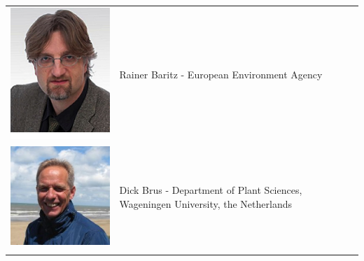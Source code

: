 \documentclass[10pt,b5paper,]{book}
\theoremstyle{definition}
\theoremstyle{definition}
\theoremstyle{definition}
\theoremstyle{remark}
\begin{document}
\begin{longtable}[]{@{}ll@{}}
\toprule
\endhead
\begin{minipage}[t]{0.11\columnwidth}\raggedright
\includegraphics{contrAuthors/Baritz.jpg}\strut
\end{minipage} & \begin{minipage}[t]{0.83\columnwidth}\raggedright
Rainer Baritz - European Environment Agency\strut
\end{minipage}\tabularnewline
\begin{minipage}[t]{0.11\columnwidth}\raggedright
\includegraphics{contrAuthors/Brus.jpg}\strut
\end{minipage} & \begin{minipage}[t]{0.83\columnwidth}\raggedright
Dick Brus - Department of Plant Sciences, Wageningen University, the
Netherlands\strut
\end{minipage}\tabularnewline
\begin{minipage}[t]{0.11\columnwidth}\raggedright

\end{minipage}
\end{longtable}
\end{document}
